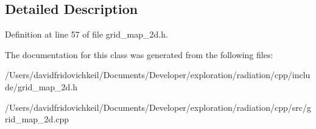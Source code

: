 \subsection{Detailed Description}


Definition at line 57 of file grid\+\_\+map\+\_\+2d.\+h.



The documentation for this class was generated from the following files\+:\begin{DoxyCompactItemize}
\item 
/\+Users/davidfridovichkeil/\+Documents/\+Developer/exploration/radiation/cpp/include/grid\+\_\+map\+\_\+2d.\+h\item 
/\+Users/davidfridovichkeil/\+Documents/\+Developer/exploration/radiation/cpp/src/grid\+\_\+map\+\_\+2d.\+cpp\end{DoxyCompactItemize}
